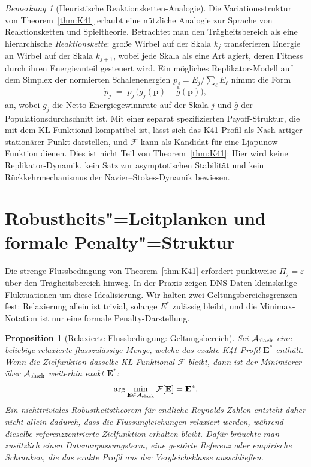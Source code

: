 \documentclass[12pt,a4paper]{article}
\theoremstyle{definition}
\theoremstyle{plain}
\newtheorem{proposition}[definition]{Proposition}
\theoremstyle{remark}
\newtheorem{remark}[definition]{Bemerkung}
\begin{document}
\begin{remark}[Heuristische Reaktionsketten-Analogie]\label{rem:nash}
Die Variationsstruktur von Theorem~\ref{thm:K41} erlaubt eine nützliche
Analogie zur Sprache von Reaktionsketten und Spieltheorie. Betrachtet man
den Trägheitsbereich als eine hierarchische \emph{Reaktionskette}: große
Wirbel auf der Skala $k_j$ transferieren Energie an Wirbel auf der Skala
$k_{j+1}$, wobei jede Skala als eine \glqq Art\grqq{} agiert, deren Fitness durch ihren
Energieanteil gesteuert wird. Ein mögliches Replikator-Modell auf dem
Simplex der normierten Schalenenergien
$p_j = E_j / \sum_\ell E_\ell$ nimmt die Form
\[
  \dot{p}_j
  \;=\;
  p_j\,\bigl(g_j(\mathbf{p}) - \bar{g}(\mathbf{p})\bigr),
\]
an, wobei $g_j$ die Netto-Energiegewinnrate auf der Skala $j$ und $\bar{g}$ der
Populationsdurchschnitt ist. Mit einer separat spezifizierten Payoff-Struktur,
die mit dem KL-Funktional kompatibel ist, lässt sich das K41-Profil als
Nash-artiger stationärer Punkt darstellen, und $\mathcal{F}$ kann als
Kandidat für eine Ljapunow-Funktion dienen. Dies ist nicht Teil von
Theorem~\ref{thm:K41}: Hier wird keine Replikator-Dynamik, kein Satz zur
asymptotischen Stabilität und kein Rückkehrmechanismus der
Navier--Stokes-Dynamik bewiesen.
\end{remark}

\section[Robustheits-Leitplanken und formale Penalty-Struktur]{Robustheits"=Leitplanken und\\formale Penalty"=Struktur}\label{sec:robustness}

Die strenge Flussbedingung von Theorem~\ref{thm:K41} erfordert
punktweise $\Pi_j = \varepsilon$ über den Trägheitsbereich hinweg.
In der Praxis zeigen DNS-Daten kleinskalige
Fluktuationen um diese Idealisierung. Wir halten zwei Geltungsbereichsgrenzen
fest: Relaxierung allein ist trivial, solange $E^*$ zulässig bleibt, und die
Minimax-Notation ist nur eine formale Penalty-Darstellung.

\begin{proposition}[Relaxierte Flussbedingung: Geltungsbereich]
\label{prop:dfc-slack}
Sei $\mathcal{A}_{\textup{slack}}$ eine beliebige relaxierte
flusszulässige Menge, welche das exakte K41-Profil $\mathbf{E}^*$ enthält.
Wenn die Zielfunktion dasselbe KL-Funktional $\mathcal{F}$ bleibt, dann ist
der Minimierer über $\mathcal{A}_{\textup{slack}}$ weiterhin exakt
$\mathbf{E}^*$:
\begin{equation}\label{eq:dfc-slack-bound}
  \arg\min_{\mathbf{E}\in\mathcal{A}_{\textup{slack}}}
  \mathcal{F}[\mathbf{E}]
  = \mathbf{E}^*.
\end{equation}
Ein nichttriviales Robustheitstheorem für endliche Reynolds-Zahlen entsteht
daher nicht allein dadurch, dass die Flussungleichungen relaxiert werden,
während dieselbe referenzzentrierte Zielfunktion erhalten bleibt. Dafür
bräuchte man zusätzlich einen Datenanpassungsterm, eine gestörte Referenz
oder empirische Schranken, die das exakte Profil aus der Vergleichsklasse
ausschließen.
\end{proposition}
\end{document}
